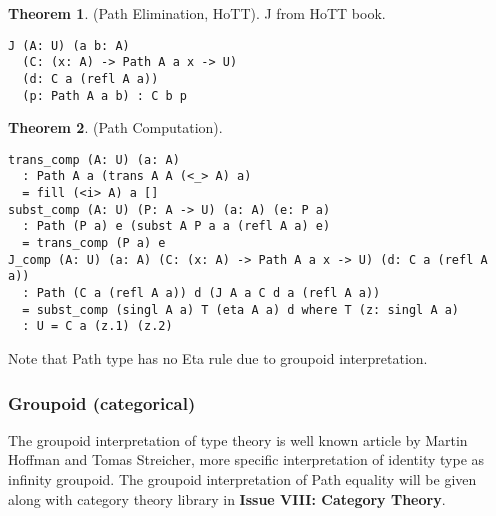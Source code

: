 \documentclass{article}
\theoremstyle{definition}
\newtheorem{theorem}{Theorem}
\begin{document}
\begin{theorem} (Path Elimination, HoTT).
J from HoTT book.
\begin{lstlisting}
J (A: U) (a b: A)
  (C: (x: A) -> Path A a x -> U)
  (d: C a (refl A a))
  (p: Path A a b) : C b p
\end{lstlisting}
\end{theorem}

\begin{theorem} (Path Computation).
\begin{lstlisting}
trans_comp (A: U) (a: A)
  : Path A a (trans A A (<_> A) a)
  = fill (<i> A) a []
subst_comp (A: U) (P: A -> U) (a: A) (e: P a)
  : Path (P a) e (subst A P a a (refl A a) e)
  = trans_comp (P a) e
J_comp (A: U) (a: A) (C: (x: A) -> Path A a x -> U) (d: C a (refl A a))
  : Path (C a (refl A a)) d (J A a C d a (refl A a))
  = subst_comp (singl A a) T (eta A a) d where T (z: singl A a)
  : U = C a (z.1) (z.2)
\end{lstlisting}
\end{theorem}

Note that  Path type has no Eta rule due to groupoid interpretation.

\subsubsection{Groupoid (categorical)}

The groupoid interpretation of type theory is well known article by Martin Hoffman and Tomas Streicher,
more specific interpretation of identity type as infinity groupoid.
The groupoid interpretation of Path equality will be given along with category theory library
in {\bf Issue VIII: Category Theory}.

\newpage
\end{document}
